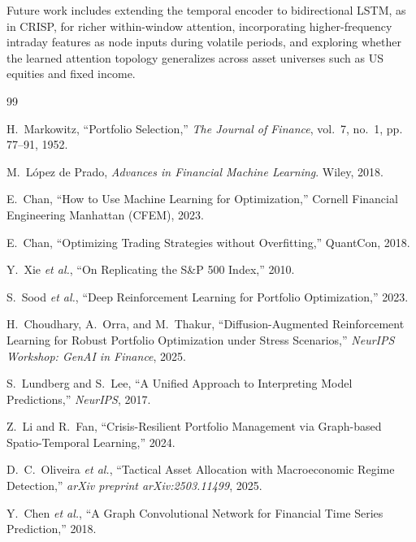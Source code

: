\documentclass[conferences]{IEEEtran}
\begin{document}
Future work includes extending the temporal encoder to bidirectional LSTM, as in CRISP, for richer within-window attention, incorporating higher-frequency intraday features as node inputs during volatile periods, and exploring whether the learned attention topology generalizes across asset universes such as US equities and fixed income.


\begin{thebibliography}{99}

H.~Markowitz, ``Portfolio Selection,'' \emph{The Journal of Finance}, vol.~7, no.~1, pp. 77--91, 1952.

M.~L\'{o}pez de Prado, \emph{Advances in Financial Machine Learning}. Wiley, 2018.

E.~Chan, ``How to Use Machine Learning for Optimization,'' Cornell Financial Engineering Manhattan (CFEM), 2023.

E.~Chan, ``Optimizing Trading Strategies without Overfitting,'' QuantCon, 2018.

Y.~Xie \emph{et al.}, ``On Replicating the S\&P 500 Index,'' 2010.

S.~Sood \emph{et al.}, ``Deep Reinforcement Learning for Portfolio Optimization,'' 2023.

H.~Choudhary, A.~Orra, and M.~Thakur, ``Diffusion-Augmented Reinforcement Learning for Robust Portfolio Optimization under Stress Scenarios,'' \emph{NeurIPS Workshop: GenAI in Finance}, 2025.

S.~Lundberg and S.~Lee, ``A Unified Approach to Interpreting Model Predictions,'' \emph{NeurIPS}, 2017.

Z.~Li and R.~Fan, ``Crisis-Resilient Portfolio Management via Graph-based Spatio-Temporal Learning,'' 2024.

D.~C.~Oliveira \emph{et al.}, ``Tactical Asset Allocation with Macroeconomic Regime Detection,'' \emph{arXiv preprint arXiv:2503.11499}, 2025.

Y.~Chen \emph{et al.}, ``A Graph Convolutional Network for Financial Time Series Prediction,'' 2018.

\end{thebibliography}
\end{document}
